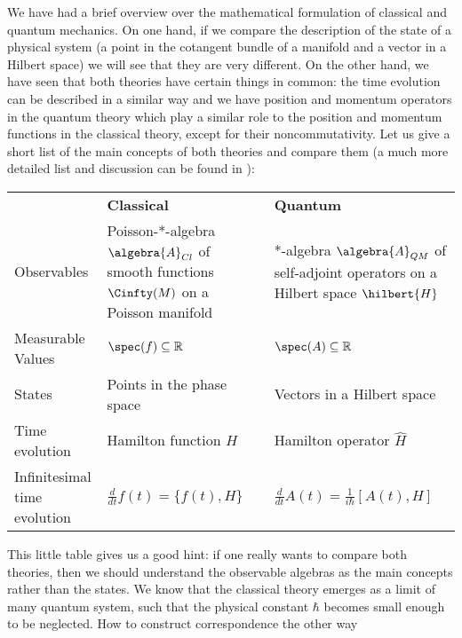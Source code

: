 We have had a brief overview over the mathematical formulation of classical and 
quantum mechanics. On one hand, if we compare the description of the state of a 
physical system (a point in the cotangent bundle of a manifold and a vector in a 
Hilbert space) we will see that they are very different. On the other hand, we 
have seen that both theories have certain things in common: the time evolution 
can be described in a similar way and we have position and momentum operators in 
the quantum theory which play a similar role to the position and momentum 
functions in the classical theory, except for their noncommutativity. Let us 
give a short list of the main concepts of both theories and compare them (a much 
more detailed list and discussion can be found in \cite{waldmann:2007a}):
\bgroup
\renewcommand{\arraystretch}{1.6}
\begin{center}
	\begin{tabular}
	{lll}
		~ 
		&
		\textbf{Classical} 
		&
		\textbf{Quantum}
		\\
		\parbox{4cm}
		{
			Observables
		}
		&
		\parbox{5cm}{
			Poisson-*-algebra $\algebra{A}_{Cl}$
			of \\
			smooth functions $\Cinfty(M)$ \\
			on a Poisson manifold
		}
		&
		\parbox{5cm}{
			*-algebra $\algebra{A}_{QM}$
			of self-adjoint operators
			on a Hilbert space $\hilbert{H}$
		}
		\\
		\parbox{4cm}
		{
			Measurable 
			Values
		}
		&
		$\spec (f) \subseteq \mathbb{R}$
		&
		$\spec (A) \subseteq \mathbb{R}$
		\\
		States
		&
		\parbox{5cm}{
			Points in the
			phase space
		}
		&
		\parbox{5cm}{
			Vectors in a
			Hilbert space
		}
		\\
		Time evolution
		&
		Hamilton function $H$
		&
		Hamilton operator $\hat{H}$
		\\
		\parbox{4cm}{
			Infinitesimal\\
			time evolution
		}
		&
		$
		\frac{d}{dt} f(t)
		=
		\{f(t), H\}
		$
		&
		$\frac{d}{dt} A(t)
		=
		\frac{1}{i \hbar}
		[A(t), H]
		$
	\end{tabular} 
\end{center}
\egroup
This little table gives us a good hint: if one really wants to compare both 
theories, then we should understand the observable algebras as the main 
concepts rather than the states. We know that the classical theory emerges as a 
limit of many quantum system, such that the physical constant $\hbar$ becomes 
small enough to be neglected. How to construct correspondence the other way 
